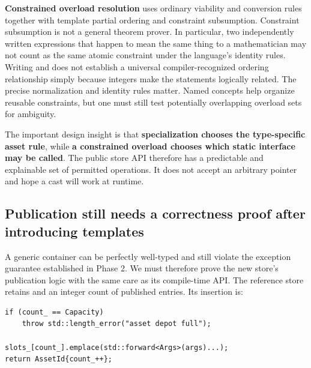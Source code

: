 \textbf{Constrained overload resolution} uses ordinary viability and conversion rules together with template partial ordering and constraint subsumption. Constraint subsumption is not a general theorem prover. In particular, two independently written expressions that happen to mean the same thing to a mathematician may not count as the same atomic constraint under the language's identity rules. Writing  and  does not establish a universal compiler-recognized ordering relationship simply because integers make the statements logically related. The precise normalization and identity rules matter. Named concepts help organize reusable constraints, but one must still test potentially overlapping overload sets for ambiguity.

The important design insight is that \textbf{specialization chooses the type-specific asset rule}, while \textbf{a constrained overload chooses which static interface may be called}. The public store API therefore has a predictable and explainable set of permitted operations. It does not accept an arbitrary pointer and hope a cast will work at runtime.

\subsection{Publication still needs a correctness proof after introducing templates}\label{05-engine-i-ch005-publication-still-needs-a-correctness-proof-after-introducing-templates}

\hypertarget{05-engine-i-ch005-publication-still-needs-a-correctness-proof-after-introducing-templates}{}

A generic container can be perfectly well-typed and still violate the exception guarantee established in Phase 2. We must therefore prove the new store's publication logic with the same care as its compile-time API. The reference store retains  and an integer count of published entries. Its insertion is:

\begin{verbatim}
if (count_ == Capacity)
    throw std::length_error("asset depot full");

slots_[count_].emplace(std::forward<Args>(args)...);
return AssetId{count_++};
\end{verbatim}

